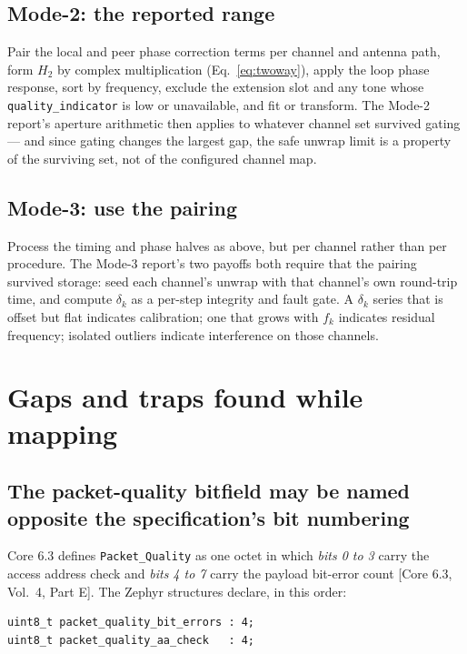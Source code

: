 \documentclass[11pt,a4paper]{article}
\newcommand{\code}[1]{\texttt{\small #1}}
\newcommand{\core}[1]{\textcolor{rulegrey}{\small[Core 6.3, #1]}}
\begin{document}
\subsection{Mode-2: the reported range}

Pair the local and peer phase correction terms per channel and antenna path, form $H_2$ by complex
multiplication (Eq.~\eqref{eq:twoway}), apply the loop phase response, sort by frequency, exclude the
extension slot and any tone whose \code{quality\_\allowbreak{}indicator} is low or unavailable, and fit or
transform. The Mode-2 report's aperture arithmetic then applies to whatever channel set survived
gating --- and since gating changes the largest gap, the safe unwrap limit is a property of the
surviving set, not of the configured channel map.

\subsection{Mode-3: use the pairing}

Process the timing and phase halves as above, but per channel rather than per procedure. The Mode-3
report's two payoffs both require that the pairing survived storage: seed each channel's unwrap with
that channel's own round-trip time, and compute $\delta_k$ as a per-step integrity and fault gate.
A $\delta_k$ series that is offset but flat indicates calibration; one that grows with $f_k$
indicates residual frequency; isolated outliers indicate interference on those channels.
\section{Gaps and traps found while mapping}
\label{sec:gaps}

\subsection{The packet-quality bitfield may be named opposite the specification's bit numbering}

Core 6.3 defines \code{Packet\_\allowbreak{}Quality} as one octet in which \emph{bits 0 to 3} carry the access
address check and \emph{bits 4 to 7} carry the payload bit-error count \core{Vol.\ 4, Part E}. The
Zephyr structures declare, in this order:

\begin{lstlisting}
uint8_t packet_quality_bit_errors : 4;
uint8_t packet_quality_aa_check   : 4;
\end{lstlisting}
\end{document}
